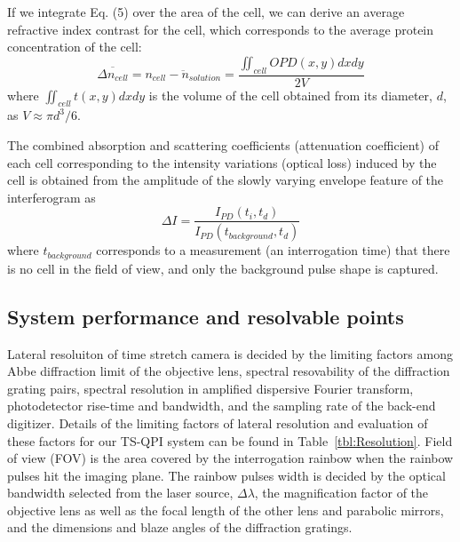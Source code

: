 \documentclass[aps,pra,reprint,superscriptaddress]{revtex4-1}
\begin{document}
If we integrate Eq. (5) over the area of the cell, we can derive an average refractive index contrast for the cell, which corresponds to the average protein concentration of the cell:
\begin{equation}
\overline{\Delta n_{cell}} = \overline{n_{cell} - n_{solution}} = \frac{\iint_{cell} OPD(x,y) dx dy}{2 V}
\end{equation}
where $\iint_{cell} t(x,y) dx dy$ is the volume of the cell obtained from its diameter, $d$, as $V \approx \pi d^3/6$. 

The combined absorption and scattering coefficients (attenuation coefficient) of each cell corresponding to the intensity variations (optical loss) induced by the cell is obtained from the amplitude of the slowly varying envelope feature of the interferogram as
\begin{equation}
\Delta I = \frac{I_{PD}(t_i,t_d)}{I_{PD}(t_{background},t_d)}
\end{equation}
where $t_{background}$ corresponds to a measurement (an interrogation time) that there is no cell in the field of view, and only the background pulse shape is captured. 



\subsection{System performance and resolvable points}

Lateral resoluiton of time stretch camera is decided by the limiting factors among Abbe diffraction limit of the objective lens, spectral resovability of the diffraction grating pairs, spectral resolution in amplified dispersive Fourier transform, photodetector rise-time and bandwidth, and the sampling rate of the back-end digitizer. Details of the limiting factors of lateral resolution and evaluation of these factors for our TS-QPI system can be found in Table~\ref{tbl:Resolution}. Field of view (FOV) is the area covered by the interrogation rainbow when the rainbow pulses hit the imaging plane. The rainbow pulses width is decided by the optical bandwidth selected from the laser source, $\Delta\lambda$, the magnification factor of the objective lens as well as the focal length of the other lens and parabolic mirrors, and the dimensions and blaze angles of the diffraction gratings.
\end{document}
